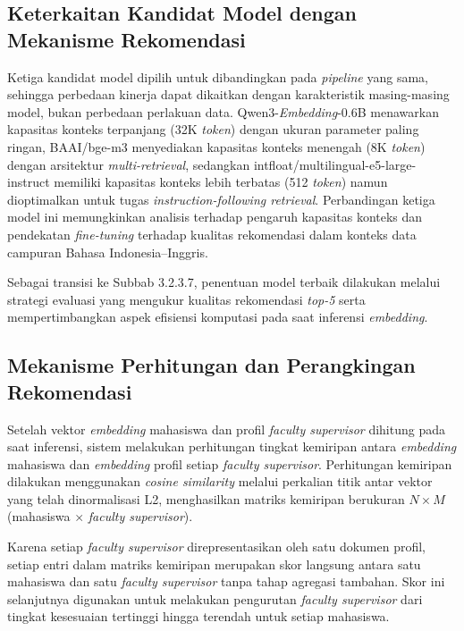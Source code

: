 \subsection{Keterkaitan Kandidat Model dengan Mekanisme Rekomendasi}\label{keterkaitan-kandidat-model-dengan-mekanisme-rekomendasi}

Ketiga kandidat model dipilih untuk dibandingkan pada \textit{pipeline} yang sama, sehingga perbedaan kinerja dapat dikaitkan dengan karakteristik masing-masing model, bukan perbedaan perlakuan data. Qwen3-\textit{Embedding}-0.6B menawarkan kapasitas konteks terpanjang (32K \textit{token}) dengan ukuran parameter paling ringan, BAAI/bge-m3 menyediakan kapasitas konteks menengah (8K \textit{token}) dengan arsitektur \textit{multi-retrieval}, sedangkan intfloat/multilingual-e5-large-instruct memiliki kapasitas konteks lebih terbatas (512 \textit{token}) namun dioptimalkan untuk tugas \textit{instruction-following retrieval}. Perbandingan ketiga model ini memungkinkan analisis terhadap pengaruh kapasitas konteks dan pendekatan \textit{fine-tuning} terhadap kualitas rekomendasi dalam konteks data campuran Bahasa Indonesia--Inggris.

Sebagai transisi ke Subbab 3.2.3.7, penentuan model terbaik dilakukan melalui strategi evaluasi yang mengukur kualitas rekomendasi \textit{top-5} serta mempertimbangkan aspek efisiensi komputasi pada saat inferensi \textit{embedding}.

\subsection{Mekanisme Perhitungan dan Perangkingan Rekomendasi}\label{mekanisme-perhitungan-dan-perangkingan-rekomendasi}

Setelah vektor \textit{embedding} mahasiswa dan profil \textit{faculty supervisor} dihitung pada saat inferensi, sistem melakukan perhitungan tingkat kemiripan antara \textit{embedding} mahasiswa dan \textit{embedding} profil setiap \textit{faculty supervisor}. Perhitungan kemiripan dilakukan menggunakan \textit{cosine similarity} melalui perkalian titik antar vektor yang telah dinormalisasi L2, menghasilkan matriks kemiripan berukuran $N \times M$ (mahasiswa $\times$ \textit{faculty supervisor}).

Karena setiap \textit{faculty supervisor} direpresentasikan oleh satu dokumen profil, setiap entri dalam matriks kemiripan merupakan skor langsung antara satu mahasiswa dan satu \textit{faculty supervisor} tanpa tahap agregasi tambahan. Skor ini selanjutnya digunakan untuk melakukan pengurutan \textit{faculty supervisor} dari tingkat kesesuaian tertinggi hingga terendah untuk setiap mahasiswa.


